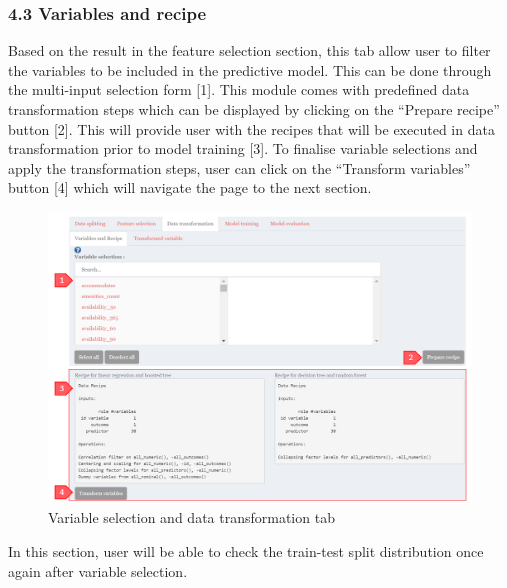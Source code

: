 \documentclass[
  12pt,
]{article}
\begin{document}
\hypertarget{variables-and-recipe}{%
\subsubsection{4.3 Variables and recipe}\label{variables-and-recipe}}

Based on the result in the feature selection section, this tab allow
user to filter the variables to be included in the predictive model.
This can be done through the multi-input selection form {[}1{]}. This
module comes with predefined data transformation steps which can be
displayed by clicking on the ``Prepare recipe'' button {[}2{]}. This
will provide user with the recipes that will be executed in data
transformation prior to model training {[}3{]}. To finalise variable
selections and apply the transformation steps, user can click on the
``Transform variables'' button {[}4{]} which will navigate the page to
the next section.

\begin{figure}[H]

{\centering \includegraphics[width=0.95\linewidth]{images/datatrf1} 

}

\caption{Variable selection and data transformation tab}\label{fig:unnamed-chunk-22}
\end{figure}

In this section, user will be able to check the train-test split
distribution once again after variable selection.
\end{document}
